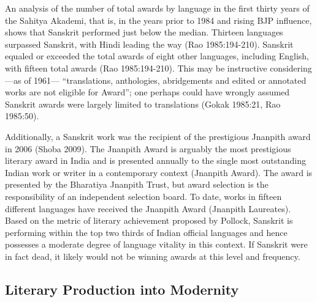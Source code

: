 An analysis of the number of total awards by language in the first thirty years of the Sahitya Akademi, that is, in the years prior to 1984 and rising BJP influence, shows that Sanskrit performed just below the median. Thirteen languages surpassed Sanskrit, with Hindi leading the way (Rao  1985:194-210). Sanskrit equaled or exceeded the total awards of eight other languages, including English, with fifteen total awards (Rao 1985:194-210). This may be instructive considering—as of 1961— “translations, anthologies, abridgements and edited or annotated works are not eligible for Award”; one perhaps could have wrongly assumed Sanskrit awards were largely limited to translations (Gokak 1985:21, Rao 1985:50). 

Additionally, a Sanskrit work was the recipient of the prestigious Jnanpith award in 2006 (Shoba 2009). The Jnanpith Award is arguably the most prestigious literary award in India and is presented annually to the single most outstanding Indian work or writer in a contemporary context (Jnanpith Award). The award is presented by the Bharatiya Jnanpith Trust, but award selection is the responsibility of an independent selection board. To date, works in fifteen different languages have received the Jnanpith Award (Jnanpith Laureates). Based on the metric of literary achievement proposed by Pollock, Sanskrit is performing within the top two thirds of Indian official languages and hence possesses a moderate degree of language vitality in this context. If Sanskrit were in fact dead, it likely would not be winning awards at this level and frequency. 
\vskip -20pt

\subsection*{Literary Production into Modernity}
\vskip -4pt

